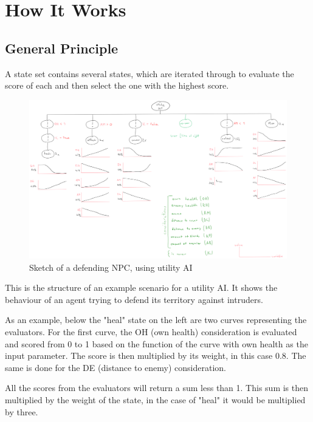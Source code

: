 \section{How It Works}
\label{sec:utilityai_howitworks}
\subsection{General Principle}
\label{subsec:utilityai_howitworks_generalprinciple}

A state set contains several states, which are iterated through to evaluate the score of each and then select the one with the highest score.

\begin{figure}[H]
	\centering
		\includegraphics[scale=0.29]{images/utility_ai_sketch_defending_ai.png}
	\caption{Sketch of a defending NPC, using utility AI}
	\label{fig:utility_ai_sketch_defending_ai}
\end{figure}

This is the structure of an example scenario for a utility AI. It shows the behaviour of an agent trying to defend its territory against intruders.

As an example, below the "heal" state on the left are two curves representing the evaluators. For the first curve, the OH (own health) consideration is evaluated and scored from 0 to 1 based on the function of the curve with own health as the input parameter. The score is then multiplied by its weight, in this case 0.8. The same is done for the DE (distance to enemy) consideration.

All the scores from the evaluators will return a sum less than 1. This sum is then multiplied by the weight of the state, in the case of "heal" it would be multiplied by three.

